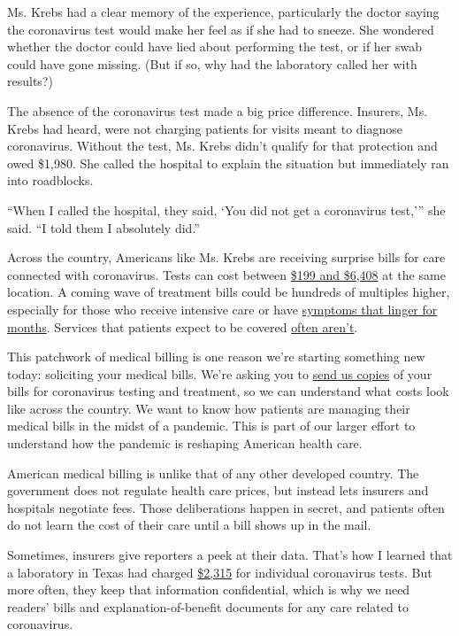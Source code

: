 Ms. Krebs had a clear memory of the experience, particularly the doctor
saying the coronavirus test would make her feel as if she had to sneeze.
She wondered whether the doctor could have lied about performing the
test, or if her swab could have gone missing. (But if so, why had the
laboratory called her with results?)

The absence of the coronavirus test made a big price difference.
Insurers, Ms. Krebs had heard, were not charging patients for visits
meant to diagnose coronavirus. Without the test, Ms. Krebs didn't
qualify for that protection and owed \$1,980. She called the hospital to
explain the situation but immediately ran into roadblocks.

``When I called the hospital, they said, `You did not get a coronavirus
test,''' she said. ``I told them I absolutely did.''

Across the country, Americans like Ms. Krebs are receiving surprise
bills for care connected with coronavirus. Tests can cost between
\href{https://www.nytimes3xbfgragh.onion/2020/06/29/upshot/coronavirus-tests-unpredictable-prices.html}{\$199
and \$6,408} at the same location. A coming wave of treatment bills
could be hundreds of multiples higher, especially for those who receive
intensive care or have
\href{https://www.nytimes3xbfgragh.onion/2020/07/01/health/coronavirus-recovery-survivors.html}{symptoms
that linger for months}. Services that patients expect to be covered
\href{https://khn.org/news/bill-of-the-month-covid19-tests-are-free-except-when-theyre-not/}{often
aren't}.

This patchwork of medical billing is one reason we're starting something
new today: soliciting your medical bills. We're asking you to
\href{https://www.nytimes3xbfgragh.onion/2020/08/03/reader-center/coronavirus-medical-bills.html}{send
us copies} of your bills for coronavirus testing and treatment, so we
can understand what costs look like across the country. We want to know
how patients are managing their medical bills in the midst of a
pandemic. This is part of our larger effort to understand how the
pandemic is reshaping American health care.

American medical billing is unlike that of any other developed country.
The government does not regulate health care prices, but instead lets
insurers and hospitals negotiate fees. Those deliberations happen in
secret, and patients often do not learn the cost of their care until a
bill shows up in the mail.

Sometimes, insurers give reporters a peek at their data. That's how I
learned that a laboratory in Texas had charged
\href{https://www.nytimes3xbfgragh.onion/2020/06/16/upshot/coronavirus-test-cost-varies-widely.html}{\$2,315}
for individual coronavirus tests. But more often, they keep that
information confidential, which is why we need readers' bills and
explanation-of-benefit documents for any care related to coronavirus.

